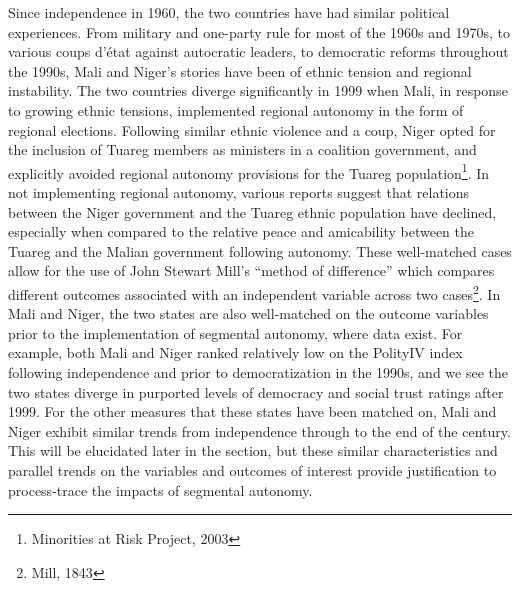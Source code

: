 \documentclass[12pt]{article}
\begin{document}
Since independence in 1960, the two countries have had similar political experiences. From military and one-party rule for most of the 1960s and 1970s, to various coups d’état against autocratic leaders, to democratic reforms throughout the 1990s, Mali and Niger's stories have been of ethnic tension and regional instability. The two countries diverge significantly in 1999 when Mali, in response to growing ethnic tensions, implemented regional autonomy in the form of regional elections. Following similar ethnic violence and a coup, Niger opted for the inclusion of Tuareg members as ministers in a coalition government, and explicitly avoided regional autonomy provisions for the Tuareg population\footnote{Minorities at Risk Project, 2003}. In not implementing regional autonomy, various reports suggest that relations between the Niger government and the Tuareg ethnic population have declined, especially when compared to the relative peace and amicability between the Tuareg and the Malian government following autonomy. These well-matched cases allow for the use of John Stewart Mill's ``method of difference'' which compares different outcomes associated with an independent variable across two cases\footnote{Mill, 1843}. In Mali and Niger, the two states are also well-matched on the outcome variables prior to the implementation of segmental autonomy, where data exist. For example, both Mali and Niger ranked relatively low on the PolityIV index following independence and prior to democratization in the 1990s, and we see the two states diverge in purported levels of democracy and social trust ratings after 1999. For the other measures that these states have been matched on, Mali and Niger exhibit similar trends from independence through to the end of the century. This will be elucidated later in the section, but these similar characteristics and parallel trends on the variables and outcomes of interest provide justification to process-trace the impacts of segmental autonomy. 
\end{document}
